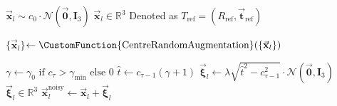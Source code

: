 \begin{suppalgorithm}
    \caption{\textbf{Sample Diffusion}\\
    A variant of \autoref{alg:af3_diffusion} that enforces a predetermined symmetry in each denoising step. To do so, the algorithm keeps track of all motion applied to the model throughout the algorithm. All differences to \autoref{alg:af3_diffusion} are highlighted in yellow.
    }
    {\small
    \begin{algorithmic}[1]
        \State $\vec{\mathbf{x}}_l \sim c_0 \cdot \mathcal{N}(\vec{\mathbf{0}}, \mathbf{I}_3)$ \hfill $\vec{\mathbf{x}}_l \in \mathbb{R}^3$
         \hfill Denoted as $T_{\text{ref}}=(R_{\text{ref}}, \vec{\mathbf{t}}_{\text{ref}})$
        
            \State $\{\vec{\mathbf{x}}_l\}$$ \gets \CustomFunction{\text{CentreRandomAugmentation}}(\{\vec{\mathbf{x}}_l\})$
            
            \State $\gamma \gets \gamma_0 \text{ if } c_\tau > \gamma_{\min} \text{ else } 0$
            \State $\hat{t} \gets c_{\tau-1}(\gamma + 1)$
            \State $\vec{\boldsymbol{\xi}}_l \gets \lambda \sqrt{\hat{t}^2 - c_{\tau-1}^2} \cdot \mathcal{N}(\vec{\mathbf{0}}, \mathbf{I}_3)$ \hfill $\vec{\boldsymbol{\xi}}_l \in \mathbb{R}^3$
            \State $\vec{\mathbf{x}}_l^{\text{noisy}} \gets \vec{\mathbf{x}}_l + \vec{\boldsymbol{\xi}}_l$
            

\end{algorithmic}}
\end{suppalgorithm}
